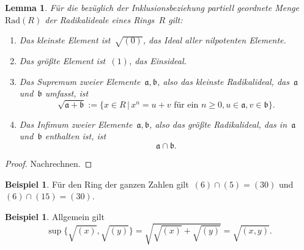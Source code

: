 \documentclass[a4paper,ngerman,12pt]{scrartcl}
\theoremstyle{definition}
\newtheorem{bsp}[defn]{Beispiel}
\theoremstyle{plain}
\newtheorem{lemma}[defn]{Lemma}
\theoremstyle{remark}
\renewcommand{\aa}{\mathfrak{a}}
\newcommand{\bb}{\mathfrak{b}}
\newcommand{\Rad}{\mathrm{Rad}}
\renewcommand{\_}{\mathpunct{.}\,}
\newcommand{\?}{\,{:}\,}
\begin{document}
\begin{lemma}\label{lemma:rad}%
Für die bezüglich der Inklusionsbeziehung partiell geordnete Menge~$\Rad(R)$
der Radikalideale eines Rings~$R$ gilt:
\begin{enumerate}
\item Das kleinste Element ist~$\sqrt{(0)}$, das Ideal aller nilpotenten
Elemente.
\item Das größte Element ist~$(1)$, das Einsideal.
\item Das Supremum zweier Elemente~$\aa,\bb$, also das kleinste Radikalideal,
das~$\aa$ und~$\bb$ umfasst, ist
\[ \sqrt{\aa + \bb} := \{ x \in R \,|\, \text{$x^n = u + v$ für ein~$n \geq 0,
u \in \aa, v \in \bb$} \}. \]
\item Das Infimum zweier Elemente~$\aa,\bb$, also das größte Radikalideal,
das in~$\aa$ und~$\bb$ enthalten ist, ist
\[ \aa \cap \bb. \]
\end{enumerate}
\end{lemma}
\begin{proof}Nachrechnen.\end{proof}

\begin{bsp}Für den Ring der ganzen Zahlen gilt~$(6) \cap (5) = (30)$ und~$(6)
\cap (15) = (30)$.\end{bsp}

\begin{bsp}Allgemein gilt
\[ \sup\bigl\{ \sqrt{(x)}, \sqrt{(y)} \bigr\} = \sqrt{\sqrt{(x)} + \sqrt{(y)}} =
\sqrt{(x,y)}. \]
\end{bsp}

\nocite{*}
\printbibliography
\end{document}
